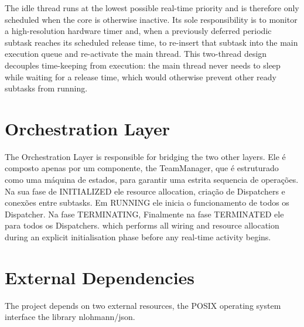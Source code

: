 The idle thread runs at the lowest possible real-time priority and is therefore only scheduled when the core is otherwise inactive. Its sole responsibility is to
monitor a high-resolution hardware timer and, when a previously deferred periodic subtask reaches its scheduled release time, to re-insert that subtask into the main execution queue and re-activate the main thread. This two-thread design decouples time-keeping from execution: the main thread never needs to sleep while waiting for a release time, which would otherwise prevent other ready subtasks from running.



\section{Orchestration Layer}
The Orchestration Layer is responsible for bridging the two other layers. Ele é composto apenas por um componente, the TeamManager, 
que é estruturado como uma máquina de estados, para garantir uma estrita sequencia de operações. Na sua fase de INITIALIZED ele resource allocation, criação de Dispatchers e conexões entre subtasks. Em RUNNING ele inicia o funcionamento de todos os Dispatcher. 
Na fase TERMINATING, 
Finalmente na fase TERMINATED ele para todos os Dispatchers.
which performs all wiring and resource allocation during an explicit initialisation phase before any real-time activity begins. 

\section{External Dependencies}
The project depends on two external resources, the POSIX operating system interface the library nlohmann/json.